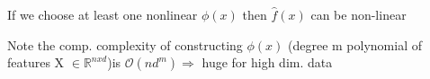 If we choose at least one nonlinear $\phi(x)$ then $\hat{f}(x)$ can be non-linear

Note the comp. complexity of constructing $\phi(x)$ (degree m polynomial of features X $\in \mathbb{R}^{nxd}$)is $\mathcal{O}(nd^m) \Rightarrow$ huge for high dim. data






